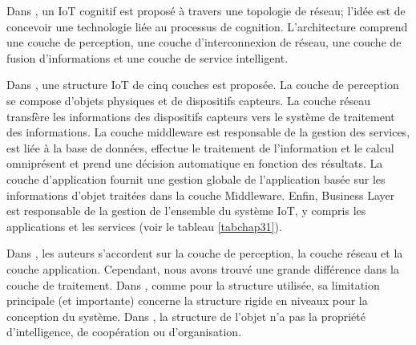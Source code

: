 Dans \cite{chap314}, un IoT cognitif est proposé à travers une topologie de réseau; l'idée est de concevoir une technologie liée au processus de cognition. L'architecture comprend une couche de perception, une couche d'interconnexion de réseau, une couche de fusion d'informations et une couche de service intelligent.


Dans \cite{chap315}, une structure IoT de cinq couches est proposée. La couche de perception se compose d'objets physiques et de dispositifs capteurs. La couche réseau transfère les informations des dispositifs capteurs vers le système de traitement des informations. La couche middleware est responsable de la gestion des services, est liée à la base de données, effectue le traitement de l'information et le calcul omniprésent et prend une décision automatique en fonction des résultats. La couche d'application fournit une gestion globale de l'application basée sur les informations d'objet traitées dans la couche Middleware. Enfin, Business Layer est responsable de la gestion de l'ensemble du système IoT, y compris les applications et les services (voir le tableau \ref{tabchap31}).


Dans \cite{chap312} \cite{chap313} \cite{chap314} \cite{chap315}, les auteurs s'accordent sur la couche de perception, la couche réseau et la couche application. Cependant, nous avons trouvé une grande différence dans la couche de traitement. Dans \cite{chap312} \cite{chap313} \cite{chap314}, comme pour la structure utilisée, sa limitation principale (et importante) concerne la structure rigide en niveaux pour la conception du système. Dans \cite{chap312} \cite{chap313}, la structure de l'objet n'a pas la propriété d'intelligence, de coopération ou d'organisation.

